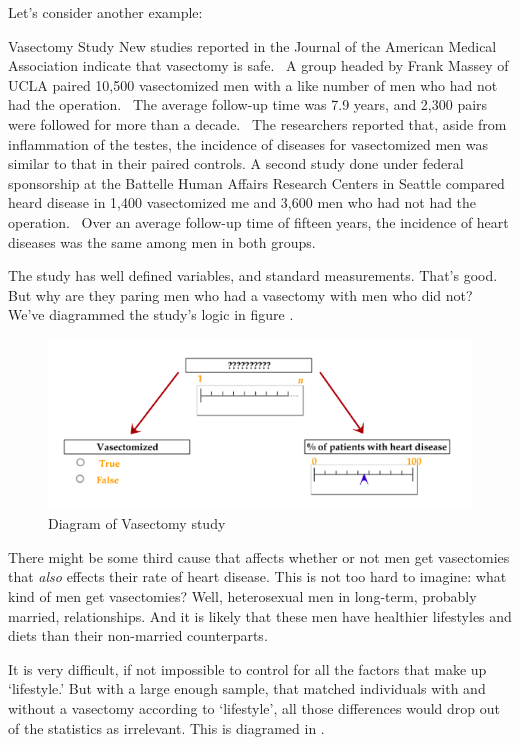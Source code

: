 \begin{refsection}
Let’s consider another example:

\begin{apatextbox}{Vasectomy Study}
New studies reported in the Journal of the American Medical Association indicate that vasectomy is safe.  A group headed by Frank Massey of UCLA paired 10,500 vasectomized men with a like number of men who had not had the operation.  The average follow-up time was 7.9 years, and 2,300 pairs were followed for more than a decade.  The researchers reported that, aside from inflammation of the testes, the incidence of diseases for vasectomized men was similar to that in their paired controls.\newline
A second study done under federal sponsorship at the Battelle Human Affairs Research Centers in Seattle compared heard disease in 1,400 vasectomized me and 3,600 men who had not had the operation.  Over an average follow-up time of fifteen years, the incidence of heart diseases was the same among men in both groups. \end{apatextbox}

The study has well defined variables, and standard measurements. That’s good. But why are they paring men who had a vasectomy with men who did not? We’ve diagrammed the study’s logic in figure .
\begin{figure}\includegraphics{../images/hypothesis4.png}\caption{Diagram of Vasectomy study}\label{fig:hypothesis4}\end{figure}

There might be some third cause that affects whether or not men get vasectomies that \emph{also} effects their rate of heart disease. This is not too hard to imagine: what kind of men get vasectomies? Well, heterosexual men in long-term, probably married, relationships. And it is likely that these men have healthier lifestyles and diets than their non-married counterparts. 

It is very difficult, if not impossible to control for all the factors that make up ‘lifestyle.’ But with a large enough sample, that matched individuals with and without a vasectomy according to ‘lifestyle’, all those differences would drop out of the statistics as irrelevant. This is diagramed in .


\end{refsection}
